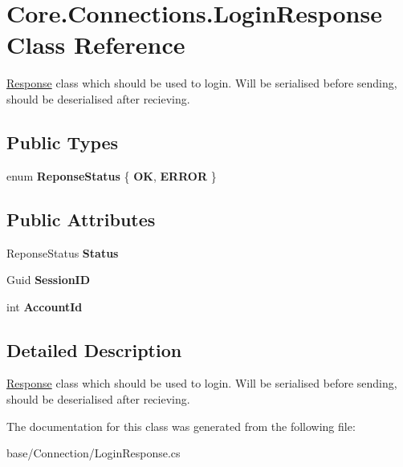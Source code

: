 \hypertarget{classCore_1_1Connections_1_1LoginResponse}{\section{Core.\-Connections.\-Login\-Response Class Reference}
\label{classCore_1_1Connections_1_1LoginResponse}
}


\hyperlink{classCore_1_1Connections_1_1Response}{Response} class which should be used to login. Will be serialised before sending, should be deserialised after recieving.  


\subsection*{Public Types}
\begin{DoxyCompactItemize}
\item 
enum {\bfseries Reponse\-Status} \{ {\bfseries O\-K}, 
{\bfseries E\-R\-R\-O\-R}
 \}
\end{DoxyCompactItemize}
\subsection*{Public Attributes}
\begin{DoxyCompactItemize}
\item 
\hypertarget{classCore_1_1Connections_1_1LoginResponse_a07d5c565863a18dc114700d9420b2d5f}{Reponse\-Status {\bfseries Status}}\label{classCore_1_1Connections_1_1LoginResponse_a07d5c565863a18dc114700d9420b2d5f}

\item 
\hypertarget{classCore_1_1Connections_1_1LoginResponse_a0852c12c3db05b5f4093ee08f5aa4107}{Guid {\bfseries Session\-I\-D}}\label{classCore_1_1Connections_1_1LoginResponse_a0852c12c3db05b5f4093ee08f5aa4107}

\item 
\hypertarget{classCore_1_1Connections_1_1LoginResponse_a2ef450c94ba6160627b8045a1829c1ff}{int {\bfseries Account\-Id}}\label{classCore_1_1Connections_1_1LoginResponse_a2ef450c94ba6160627b8045a1829c1ff}

\end{DoxyCompactItemize}


\subsection{Detailed Description}
\hyperlink{classCore_1_1Connections_1_1Response}{Response} class which should be used to login. Will be serialised before sending, should be deserialised after recieving. 



The documentation for this class was generated from the following file\-:\begin{DoxyCompactItemize}
\item 
base/\-Connection/Login\-Response.\-cs\end{DoxyCompactItemize}
